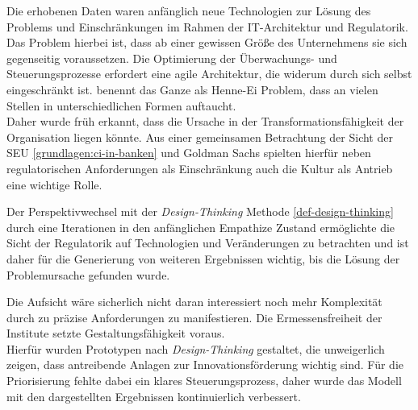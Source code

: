 Die erhobenen Daten waren anfänglich neue Technologien zur Lösung des Problems und Einschränkungen im Rahmen der IT-Architektur und Regulatorik. Das Problem hierbei ist, dass ab einer gewissen Größe des Unternehmens sie sich gegenseitig voraussetzen. Die Optimierung der Überwachungs- und Steuerungsprozesse erfordert eine agile Architektur, die widerum durch sich selbst eingeschränkt ist. \citet{Ganswindt2006} benennt das Ganze als Henne-Ei Problem, dass an vielen Stellen in unterschiedlichen Formen auftaucht.
\medskip
\\
Daher wurde früh erkannt, dass die Ursache in der Transformationsfähigkeit der Organisation liegen könnte. Aus einer gemeinsamen Betrachtung der Sicht der \ac{SEU} \ref{grundlagen:ci-in-banken} und Goldman Sachs \cite{Gupta:2017} spielten hierfür neben regulatorischen Anforderungen als Einschränkung auch die Kultur als Antrieb eine wichtige Rolle.

Der Perspektivwechsel mit der \emph{Design-Thinking} Methode \ref{def-design-thinking} durch eine Iterationen in den anfänglichen Empathize Zustand ermöglichte die Sicht der Regulatorik auf Technologien und Veränderungen zu betrachten und ist daher für die Generierung von weiteren Ergebnissen wichtig, bis die Lösung der Problemursache gefunden wurde.

Die Aufsicht wäre sicherlich nicht daran interessiert noch mehr Komplexität durch zu präzise Anforderungen zu manifestieren. Die Ermessensfreiheit der Institute setzte Gestaltungsfähigkeit voraus.
\medskip
\\
Hierfür wurden Prototypen nach \emph{Design-Thinking} gestaltet, die unweigerlich zeigen, dass antreibende Anlagen zur Innovationsförderung wichtig sind. Für die Priorisierung fehlte dabei ein klares Steuerungsprozess, daher wurde das Modell mit den dargestellten Ergebnissen kontinuierlich verbessert.


